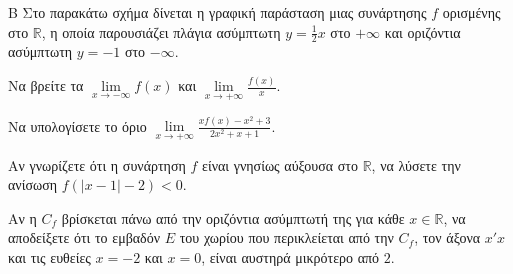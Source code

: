 \begin{thema}{Β}
Στο παρακάτω σχήμα δίνεται η γραφική παράσταση μιας συνάρτησης $f$ ορισμένης στο $\mathbb{R}$, η οποία παρουσιάζει πλάγια ασύμπτωτη $y = \frac{1}{2}x$ στο $+\infty$ και οριζόντια ασύμπτωτη $y = -1$ στο $-\infty$.

\begin{center}
\end{center}

\begin{erwthma}
  \item Να βρείτε τα $\displaystyle\lim\limits_{x \to -\infty} f(x)$ και $\displaystyle\lim\limits_{x \to +\infty} \frac{f(x)}{x}$.
  \item Να υπολογίσετε το όριο $\displaystyle\lim\limits_{x \to +\infty} \frac{x f(x) - x^2 + 3}{2x^2 + x + 1}$.
  \item Αν γνωρίζετε ότι η συνάρτηση $f$ είναι γνησίως αύξουσα στο $\mathbb{R}$, να λύσετε την ανίσωση $f\left(|x-1| - 2\right) < 0$.
  \item Αν η $C_f$ βρίσκεται πάνω από την οριζόντια ασύμπτωτή της για κάθε $x \in \mathbb{R}$, να αποδείξετε ότι το εμβαδόν $E$ του χωρίου που περικλείεται από την $C_f$, τον άξονα $x'x$ και τις ευθείες $x=-2$ και $x=0$, είναι αυστηρά μικρότερο από $2$.
\end{erwthma}
\end{thema}

